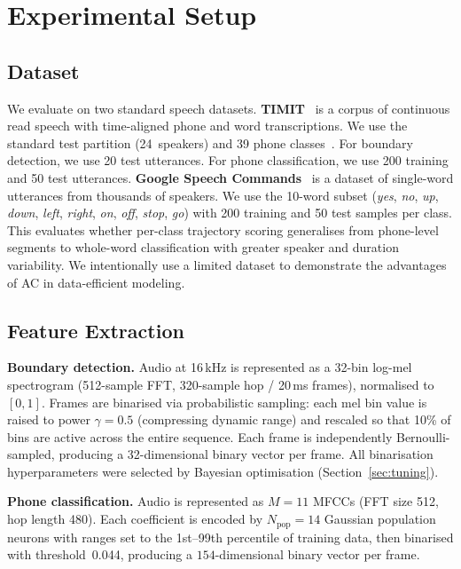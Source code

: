 \section{Experimental Setup}

\subsection{Dataset}

We evaluate on two standard speech datasets. \textbf{TIMIT}~\cite{TIMIT92} is a corpus of continuous read speech with time-aligned phone and word transcriptions. We use the standard test partition (24~speakers) and 39 phone classes~\cite{Lee89}. %
For boundary detection, we use 20 test utterances. For phone classification, we use 200 training and 50 test utterances. \textbf{Google Speech Commands}~\cite{Warden18} is a dataset of single-word utterances from thousands of speakers. We use the 10-word subset (\textit{yes}, \textit{no}, \textit{up}, \textit{down}, \textit{left}, \textit{right}, \textit{on}, \textit{off}, \textit{stop}, \textit{go}) with 200 training and 50 test samples per class. This evaluates whether per-class trajectory scoring generalises from phone-level segments to whole-word classification with greater speaker and duration variability. We intentionally use a limited dataset to demonstrate the advantages of AC in data-efficient modeling.

\subsection{Feature Extraction}
\textbf{Boundary detection.} Audio at 16\,kHz is represented as a 32-bin log-mel spectrogram (512-sample FFT, 320-sample hop / 20\,ms frames), normalised to $[0,1]$. Frames are binarised via probabilistic sampling: each mel bin value is raised to power $\gamma{=}0.5$ (compressing dynamic range) and rescaled so that 10\% of bins are active across the entire sequence. Each frame is independently Bernoulli-sampled, producing a 32-dimensional binary vector per frame. All binarisation hyperparameters were selected by Bayesian optimisation (Section~\ref{sec:tuning}).

\noindent \textbf{Phone classification.} Audio is represented as $M{=}11$ MFCCs (FFT size 512, hop length 480). Each coefficient is encoded by $N_\mathrm{pop}{=}14$ Gaussian population neurons with ranges set to the 1st--99th percentile of training data, then binarised with threshold~0.044, producing a $154$-dimensional binary vector per frame.

